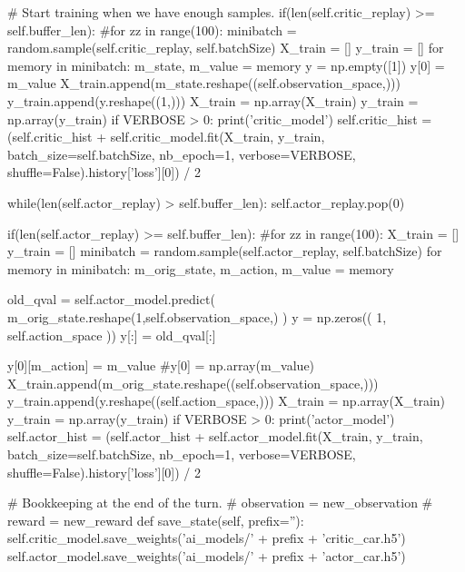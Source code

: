 \begin{python}
# Start training when we have enough samples.
if(len(self.critic_replay) >= self.buffer_len):
#for zz in range(100):
minibatch = random.sample(self.critic_replay, self.batchSize)
X_train = []
y_train = []
for memory in minibatch:
m_state, m_value = memory
y = np.empty([1])
y[0] = m_value
X_train.append(m_state.reshape((self.observation_space,)))
y_train.append(y.reshape((1,)))
X_train = np.array(X_train)
y_train = np.array(y_train)
if VERBOSE > 0:
print('critic_model')
self.critic_hist = (self.critic_hist + self.critic_model.fit(X_train, y_train, batch_size=self.batchSize, nb_epoch=1, verbose=VERBOSE, shuffle=False).history['loss'][0]) / 2

while(len(self.actor_replay) > self.buffer_len):
self.actor_replay.pop(0)

if(len(self.actor_replay) >= self.buffer_len):
#for zz in range(100):
X_train = []
y_train = []
minibatch = random.sample(self.actor_replay, self.batchSize)
for memory in minibatch:
m_orig_state, m_action, m_value = memory

old_qval = self.actor_model.predict( m_orig_state.reshape(1,self.observation_space,) )
y = np.zeros(( 1, self.action_space ))
y[:] = old_qval[:]

y[0][m_action] = m_value
#y[0] = np.array(m_value)
X_train.append(m_orig_state.reshape((self.observation_space,)))
y_train.append(y.reshape((self.action_space,)))
X_train = np.array(X_train)
y_train = np.array(y_train)
if VERBOSE > 0:
print('actor_model')
self.actor_hist = (self.actor_hist + self.actor_model.fit(X_train, y_train, batch_size=self.batchSize, nb_epoch=1, verbose=VERBOSE, shuffle=False).history['loss'][0]) / 2


# Bookkeeping at the end of the turn.
# observation = new_observation
# reward = new_reward
def save_state(self, prefix=''):
self.critic_model.save_weights('ai_models/' + prefix + 'critic_car.h5')
self.actor_model.save_weights('ai_models/'  + prefix + 'actor_car.h5')
\end{python}

